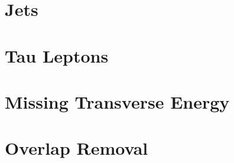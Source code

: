 \section{Jets}\label{sec:object_selection:jets}

\section{Tau Leptons}\label{sec:object_selection:tau_leptons}

\section{Missing Transverse Energy}\label{sec:object_selection:missing_transverse_energy}

\section{Overlap Removal}\label{sec:object_selection:overlap_removal}


